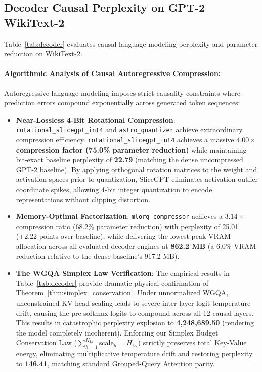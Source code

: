 \documentclass{article}
\begin{document}
\subsection{Decoder Causal Perplexity on GPT-2 WikiText-2}
Table~\ref{tab:decoder} evaluates causal language modeling perplexity and parameter reduction on WikiText-2.



\paragraph{Algorithmic Analysis of Causal Autoregressive Compression:}
Autoregressive language modeling imposes strict causality constraints where prediction errors compound exponentially across generated token sequences:
\begin{itemize}
    \item \textbf{Near-Lossless 4-Bit Rotational Compression}: \texttt{rotational\_slicegpt\_int4} and \texttt{astro\_quantizer} achieve extraordinary compression efficiency. \texttt{rotational\_slicegpt\_int4} achieves a massive \textbf{$4.00\times$ compression factor (75.0\% parameter reduction)} while maintaining bit-exact baseline perplexity of \textbf{22.79} (matching the dense uncompressed GPT-2 baseline). By applying orthogonal rotation matrices to the weight and activation spaces prior to quantization, SliceGPT eliminates activation outlier coordinate spikes, allowing 4-bit integer quantization to encode representations without clipping distortion.
    \item \textbf{Memory-Optimal Factorization}: \texttt{mlorq\_compressor} achieves a $3.14\times$ compression ratio (68.2\% parameter reduction) with perplexity of 25.01 (+2.22 points over baseline), while delivering the lowest peak VRAM allocation across all evaluated decoder engines at \textbf{862.2 MB} (a 6.0\% VRAM reduction relative to the dense baseline's 917.2 MB).
    \item \textbf{The WGQA Simplex Law Verification}: The empirical results in Table~\ref{tab:decoder} provide dramatic physical confirmation of Theorem~\ref{thm:simplex_conservation}. Under unnormalized WGQA, unconstrained KV head scaling leads to severe inter-layer logit temperature drift, causing the pre-softmax logits to compound across all 12 causal layers. This results in catastrophic perplexity explosion to \textbf{4,248,689.50} (rendering the model completely incoherent). Enforcing our Simplex Budget Conservation Law ($\sum_{h=1}^{H_{\text{kv}}} \text{scale}_h = H_{\text{kv}}$) strictly preserves total Key-Value energy, eliminating multiplicative temperature drift and restoring perplexity to \textbf{146.41}, matching standard Grouped-Query Attention parity.
\end{itemize}
\end{document}
